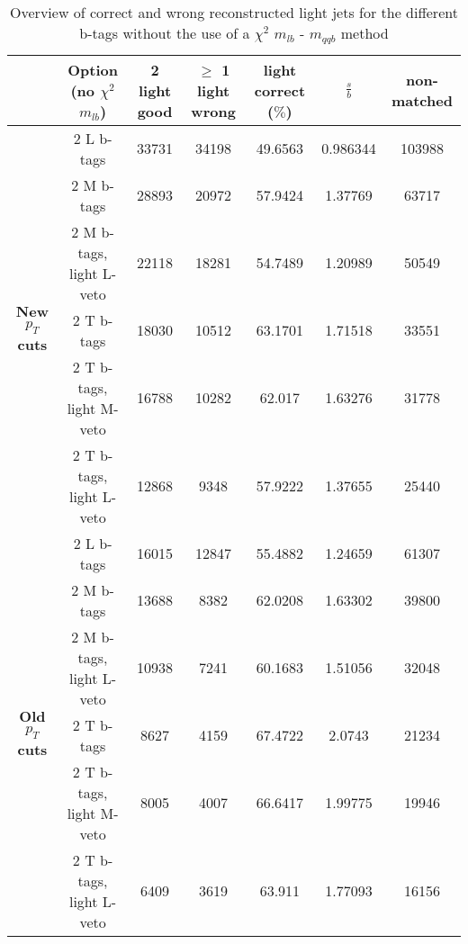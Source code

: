 \begin{landscape}
\begin{table}[!h] 
\begin{tabular}{c|c|c|c|c|c|c} 
&\textbf{Option} (no $\chi^{2}$ $m_{lb}$) & 2 light good  & $\geq$ 1 light wrong & light correct ($\%$) & $\frac{s}{b}$ & non-matched \\ \hline 
\multirow{6}{*}{\textbf{New $p_T$ cuts}} 
& 2 L b-tags              & 33731 & 34198 & 49.6563 & 0.986344 & 103988  \\ 
& 2 M b-tags              & 28893 & 20972 & 57.9424 & 1.37769 & 63717  \\ 
& 2 M b-tags, light L-veto & 22118 & 18281 & 54.7489 & 1.20989 & 50549  \\ 
& 2 T b-tags              & 18030 & 10512 & 63.1701 & 1.71518 & 33551  \\ 
& 2 T b-tags, light M-veto & 16788 & 10282 & 62.017 & 1.63276 & 31778  \\ 
& 2 T b-tags, light L-veto & 12868 & 9348 & 57.9222 & 1.37655 & 25440  \\ 
\hline
\multirow{6}{*}{\textbf{Old $p_T$ cuts}} 
& 2 L b-tags              & 16015 & 12847 & 55.4882 & 1.24659 & 61307  \\ 
& 2 M b-tags              & 13688 & 8382 & 62.0208 & 1.63302 & 39800  \\ 
& 2 M b-tags, light L-veto & 10938 & 7241 & 60.1683 & 1.51056 & 32048  \\ 
& 2 T b-tags              & 8627 & 4159 & 67.4722 & 2.0743 & 21234  \\ 
& 2 T b-tags, light M-veto & 8005 & 4007 & 66.6417 & 1.99775 & 19946  \\ 
& 2 T b-tags, light L-veto & 6409 & 3619 & 63.911 & 1.77093 & 16156  \\ 
 \end{tabular} 
\caption{Overview of correct and wrong reconstructed light jets for the different b-tags without the use of a $\chi^{2}$ $m_{lb}$ - $m_{qqb}$ method} 
 \end{table}


\end{landscape}

